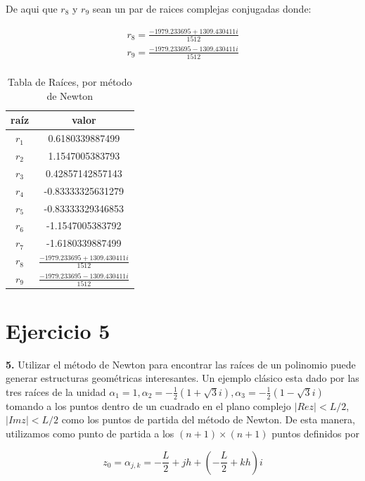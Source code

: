 \documentclass{article} %
\begin{document}
De aqui que $r_8$ y $r_9$ sean un par de raices complejas conjugadas donde:

\begin{gather*}
    r_8 = \frac{-1979.233695 + 1309.430411i}{1512}\\
    r_9 = \frac{-1979.233695 - 1309.430411i}{1512}\\
\end{gather*}

\begin{table}[H]
\large
    \centering
    \begin{tabular}{|c|c|}
    \hline
    raíz & valor \\
    \hline
    $r_1$ & 0.6180339887499\\
    \hline
    $r_2$ & 1.1547005383793\\
    \hline
    $r_3$ & 0.42857142857143\\
    \hline
    $r_4$ & -0.83333325631279\\
    \hline
    $r_5$ & -0.83333329346853\\
    \hline
    $r_6$ & -1.1547005383792\\
    \hline
    $r_7$ & -1.6180339887499\\
    \hline
    $r_8$ & $\frac{-1979.233695 + 1309.430411i}{1512}$\\
    \hline
    $r_9$ & $\frac{-1979.233695 - 1309.430411i}{1512}$\\
    \hline
    \end{tabular}
    \caption{Tabla de Raíces, por método de Newton}
    \label{tab:raices4}
\end{table}

\newpage
\section*{Ejercicio 5}

\textbf{5.} Utilizar el método de Newton para encontrar las raíces de un polinomio puede generar estructuras geométricas interesantes. Un ejemplo clásico esta dado por las tres raíces de la unidad $\alpha_1=1,\alpha_2=-\frac{1}{2}(1+\sqrt{3}i),\alpha_3=-\frac{1}{2}(1-\sqrt{3}i)$ tomando a los puntos dentro de un cuadrado en el plano complejo $|Rez|<L/2$, $|Imz|<L/2$ como los puntos de partida del método de Newton. De esta manera, utilizamos como punto de partida a los $(n+1)\times(n+1)$ puntos definidos por

\begin{equation*}
    z_0 = \alpha_{j,k} = -\frac{L}{2} + jh +\left(-\frac{L}{2} +kh\right)i
\end{equation*}
\end{document}
